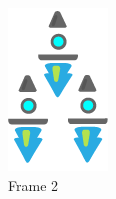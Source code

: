 \begin{figure}[!h]
  \includegraphics[width=\linewidth]{chapters/modding/fleetDetails_2.png}
  \caption*{Frame 2}
\endminipage\hfill
{}%

\end{figure}

